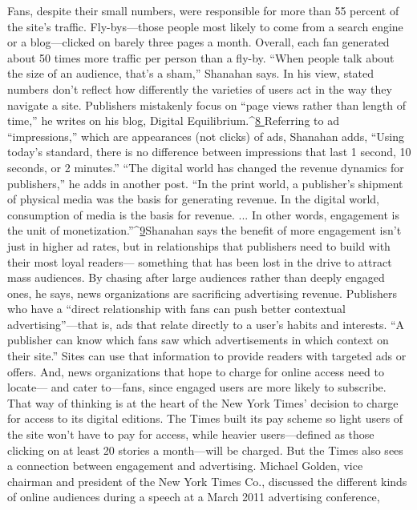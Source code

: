 Fans, despite their small numbers, were responsible for more than 55 percent of
the site’s traffic. Fly-bys—those people most likely to come from a search engine
or a blog—clicked on barely three pages a month. Overall, each fan generated
about 50 times more traffic per person than a fly-by.
``When people talk about the size of an audience, that’s a sham,'' Shanahan says.
In his view, stated numbers don’t reflect how differently the varieties of users act
in the way they navigate a site. Publishers mistakenly focus on ``page views rather
than length of time,'' he writes on his blog, Digital Equilibrium.^{\href{#endnotes-ch2}{8 }}Referring to ad
``impressions,'' which are appearances (not clicks) of ads, Shanahan adds, ``Using
today’s standard, there is no difference between impressions that last 1 second, 10
seconds, or 2 minutes.''
``The digital world has changed the revenue dynamics for publishers,'' he adds
in another post. ``In the print world, a publisher’s shipment of physical media was
the basis for generating revenue. In the digital world, consumption of media is
the basis for revenue. ... In other words, engagement is the unit of monetization.''^{\href{#endnotes-ch2}{9}}Shanahan says the benefit of more engagement isn’t just in higher ad rates,
but in relationships that publishers need to build with their most loyal readers—
something that has been lost in the drive to attract mass audiences. By chasing
after large audiences rather than deeply engaged ones, he says, news organizations
are sacrificing advertising revenue. Publishers who have a ``direct relationship
with fans can push better contextual advertising''—that is, ads that relate directly
to a user’s habits and interests. ``A publisher can know which fans saw which
advertisements in which context on their site.'' Sites can use that information to
provide readers with targeted ads or offers.
And, news organizations that hope to charge for online access need to locate—
and cater to—fans, since engaged users are more likely to subscribe. That
way of thinking is at the heart of the New York Times’ decision to charge for
access to its digital editions. The Times built its pay scheme so light users of the
site won’t have to pay for access, while heavier users—defined as those clicking
on at least 20 stories a month—will be charged. But the Times also sees a
connection between engagement and advertising. Michael Golden, vice chairman
and president of the New York Times Co., discussed the different kinds
of online audiences during a speech at a March 2011 advertising conference,

